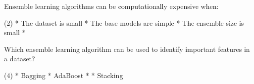 \documentclass[10pt]{extarticle}
\begin{document}
\begin{exercise}
    Ensemble learning algorithms can be computationally expensive when:
    \begin{choice} (2)
        * The dataset is small
        * The base models are simple
        * The ensemble size is small
        * 
    \end{choice}
\end{exercise}
\begin{solution}
\end{solution}

\begin{exercise}
    Which ensemble learning algorithm can be used to identify important features in a dataset?
    \begin{choice} (4)
        * Bagging
        * AdaBoost
        * 
        * Stacking
    \end{choice}
\end{exercise}
\begin{solution}
\end{solution}

\newpage
\begin{multicols*}{2}
    \printsolutions*
\end{multicols*}
\end{document}
